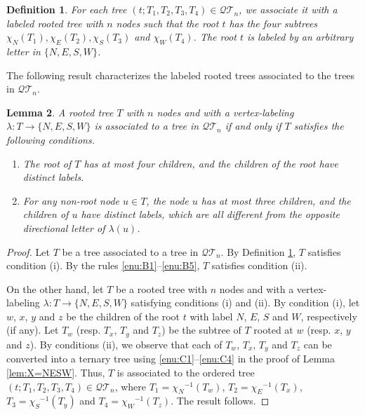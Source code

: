 \documentclass[a4paper,11pt,reqno]{amsart}
\newtheorem{lem}{Lemma}[section]
\newtheorem{defi}[lem]{Definition}
\theoremstyle{definition}
\numberwithin{equation}{section}
\newcommand{\QT}{{\mathcal{QT}}}
\begin{document}
\begin{defi} \label{def:underlying-tree} {\rm
For each tree $(t;T_1,T_2,T_3,T_4)\in\QT_n$, we associate it with a labeled rooted tree with $n$ nodes such that the root $t$ has the four subtrees $\chi_N(T_1),\chi_E(T_2),\chi_S(T_3)$ and $\chi_W(T_4)$. The root $t$ is labeled by an arbitrary letter in $\{N,E,S,W\}$.
}
\end{defi}

The following result characterizes the labeled rooted trees associated to the trees in $\QT_n$.


\begin{lem} \label{lem:NESW-representation}
A rooted tree $T$ with $n$ nodes and with a vertex-labeling $\lambda:T\rightarrow\{N,E,S,W\}$ is associated to a tree in $\QT_n$ if and only if $T$ satisfies the following conditions.
\begin{enumerate}
\item The root of $T$ has at most four children, and the children of the root have distinct labels.
\item For any non-root node $u\in T$, the node $u$ has at most three children, and the children of $u$ have distinct labels, which are all different from the opposite directional letter of $\lambda(u)$.
\end{enumerate}
\end{lem}


\begin{proof} Let $T$ be a tree associated to a tree in $\QT_n$. By Definition \ref{def:underlying-tree}, $T$ satisfies condition (i). By the rules \ref{enu:B1}--\ref{enu:B5},  $T$ satisfies condition (ii).

On the other hand, let $T$ be a rooted tree with $n$ nodes and with a vertex-labeling $\lambda: T\rightarrow\{N,E,S,W\}$ satisfying conditions (i) and (ii). By condition (i), let $w$, $x$, $y$ and $z$ be the children of the root $t$ with label $N$, $E$, $S$ and $W$, respectively (if any). Let $T_w$ (resp. $T_x$, $T_y$ and $T_z$) be the subtree of $T$ rooted at $w$ (resp. $x$, $y$ and $z$). By conditions (ii), we observe that each of $T_w$, $T_x$, $T_y$ and $T_z$ can be converted into a ternary tree using \ref{enu:C1}--\ref{enu:C4} in the proof of Lemma \ref{lem:X=NESW}. Thus, $T$ is associated to the ordered tree $(t;T_1,T_2,T_3,T_4)\in\QT_n$, where $T_1={\chi_N}^{-1}(T_w)$, $T_2={\chi_E}^{-1}(T_x)$, $T_3={\chi_S}^{-1}(T_y)$ and $T_4={\chi_W}^{-1}(T_z)$. The result follows.
\end{proof}
\end{document}
